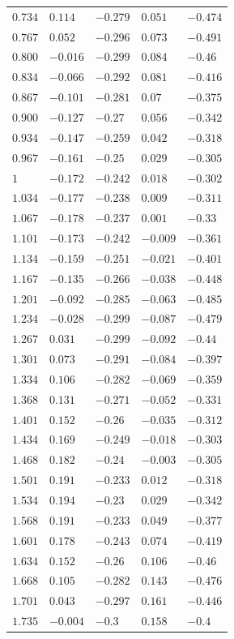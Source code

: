 \begin{center}
\begin{longtable}{lllll}
$0.734$&$0.114$&$-0.279$&$0.051$&$-0.474$\\
$0.767$&$0.052$&$-0.296$&$0.073$&$-0.491$\\
$0.800$&$-0.016$&$-0.299$&$0.084$&$-0.46$\\
$0.834$&$-0.066$&$-0.292$&$0.081$&$-0.416$\\
$0.867$&$-0.101$&$-0.281$&$0.07$&$-0.375$\\
$0.900$&$-0.127$&$-0.27$&$0.056$&$-0.342$\\
$0.934$&$-0.147$&$-0.259$&$0.042$&$-0.318$\\
$0.967$&$-0.161$&$-0.25$&$0.029$&$-0.305$\\
$1$&$-0.172$&$-0.242$&$0.018$&$-0.302$\\
$1.034$&$-0.177$&$-0.238$&$0.009$&$-0.311$\\
$1.067$&$-0.178$&$-0.237$&$0.001$&$-0.33$\\
$1.101$&$-0.173$&$-0.242$&$-0.009$&$-0.361$\\
$1.134$&$-0.159$&$-0.251$&$-0.021$&$-0.401$\\
$1.167$&$-0.135$&$-0.266$&$-0.038$&$-0.448$\\
$1.201$&$-0.092$&$-0.285$&$-0.063$&$-0.485$\\
$1.234$&$-0.028$&$-0.299$&$-0.087$&$-0.479$\\
$1.267$&$0.031$&$-0.299$&$-0.092$&$-0.44$\\
$1.301$&$0.073$&$-0.291$&$-0.084$&$-0.397$\\
$1.334$&$0.106$&$-0.282$&$-0.069$&$-0.359$\\
$1.368$&$0.131$&$-0.271$&$-0.052$&$-0.331$\\
$1.401$&$0.152$&$-0.26$&$-0.035$&$-0.312$\\
$1.434$&$0.169$&$-0.249$&$-0.018$&$-0.303$\\
$1.468$&$0.182$&$-0.24$&$-0.003$&$-0.305$\\
$1.501$&$0.191$&$-0.233$&$0.012$&$-0.318$\\
$1.534$&$0.194$&$-0.23$&$0.029$&$-0.342$\\
$1.568$&$0.191$&$-0.233$&$0.049$&$-0.377$\\
$1.601$&$0.178$&$-0.243$&$0.074$&$-0.419$\\
$1.634$&$0.152$&$-0.26$&$0.106$&$-0.46$\\
$1.668$&$0.105$&$-0.282$&$0.143$&$-0.476$\\
$1.701$&$0.043$&$-0.297$&$0.161$&$-0.446$\\
$1.735$&$-0.004$&$-0.3$&$0.158$&$-0.4$\\

\end{longtable}
\end{center}
